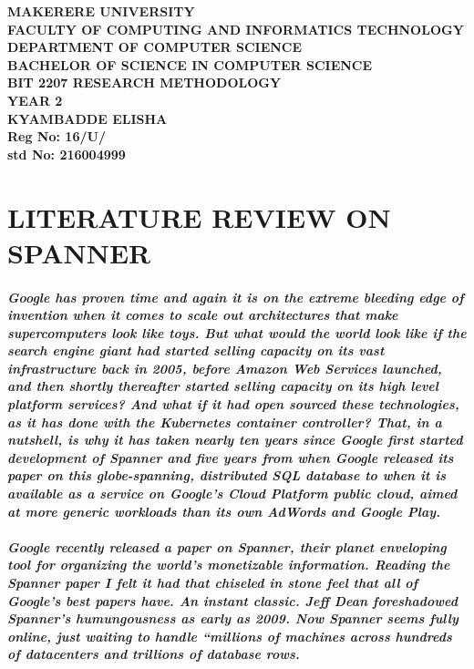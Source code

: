 \documentclass[a4paper,12pt]{article}
\begin{document}
\begin{Huge}
\begin{center}
\begin{normalsize}

\textbf{MAKERERE UNIVERSITY } \\
\textbf{FACULTY OF COMPUTING AND INFORMATICS TECHNOLOGY} \\
\textbf{DEPARTMENT OF COMPUTER SCIENCE} \\
\textbf{BACHELOR OF SCIENCE IN COMPUTER SCIENCE} \\
\textbf{BIT 2207 RESEARCH METHODOLOGY} \\
\textbf{YEAR 2} \\


\textbf{\sc KYAMBADDE ELISHA } \\
\textbf{\sc Reg No: 16/U/ } \\
\textbf{\sc std No: 216004999}\\
\end{normalsize}
\end{center}
\end{Huge}
\newpage

\section{\sc LITERATURE REVIEW ON SPANNER}
\paragraph{\sl Google has proven time and again it is on the extreme bleeding edge of invention when it comes to scale out architectures that make supercomputers look like toys. But what would the world look like if the search engine giant had started selling capacity on its vast infrastructure back in 2005, before Amazon Web Services launched, and then shortly thereafter started selling capacity on its high level platform services? And what if it had open sourced these technologies, as it has done with the Kubernetes container controller? 
That, in a nutshell, is why it has taken nearly ten years since Google first started development of Spanner and five years from when Google released its paper on this globe-spanning, distributed SQL database to when it is available as a service on Google’s Cloud Platform public cloud, aimed at more generic workloads than its own AdWords and Google Play.}\cite{Timothy}

\paragraph{ \sl Google recently released a paper on Spanner, their planet enveloping tool for organizing the world’s monetizable information. Reading the Spanner paper I felt it had that chiseled in stone feel that all of Google’s best papers have. An instant classic. Jeff Dean foreshadowed Spanner’s humungousness as early as 2009.  Now Spanner seems fully online, just waiting to handle “millions of machines across hundreds of datacenters and trillions of database rows.}\cite{Hoff}
\end{document}
